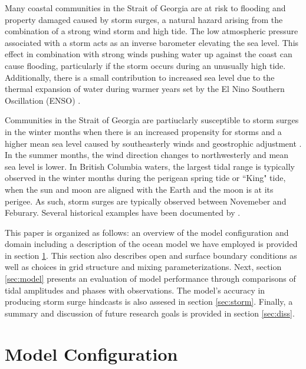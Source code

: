 \documentclass[pdftex,10pt]{article}
\begin{document}
Many coastal communities in the Strait of Georgia are at risk to flooding and property damaged caused by storm surges, a natural hazard arising from the combination of a strong wind storm and high tide. The low atmospheric pressure associated with a storm acts as an inverse barometer elevating the sea level. This effect in combination with strong winds pushing water up against the coast can cause flooding, particularly if the storm occurs during an unusually high tide.  Additionally, there is a small contribution to increased sea level due to the thermal expansion of water during warmer years set by the El Nino Southern Oscillation (ENSO) \citep{abeys2011extreme}. %

Communities in the Strait of Georgia are partiuclarly susceptible to storm surges in the winter months when there is an increased propensity for storms and a higher mean sea level caused by southeasterly winds and geostrophic adjustment \citep{danard2003storm}. In the summer months, the wind direction changes to northwesterly and mean sea level is lower. In British Columbia waters, the largest tidal range is typically observed in the winter months during the perigean spring tide or ``King" tide, when the sun and moon are aligned with the Earth and the moon is at its perigee. As such, storm surges are typically observed between Novemeber and Feburary. Several historical examples have been documented by \citet{forseth2006adaptation}. 

This paper is organized as follows: an overview of the model configuration and domain including a description of the ocean model we have employed  is provided in section \ref{sec:config}. This section also describes open and surface boundary conditions as well as choices in grid structure and mixing parameterizations. Next, section \ref{sec:model} presents an evaluation of model performance through comparisons of tidal amplitudes and phases with observations. The model's accuracy in producing storm surge hindcasts is also assesed in section \ref{sec:storm}. Finally, a summary and discussion of future research goals is provided in section \ref{sec:diss}.  

\section{Model Configuration}\label{sec:config}
\end{document}
